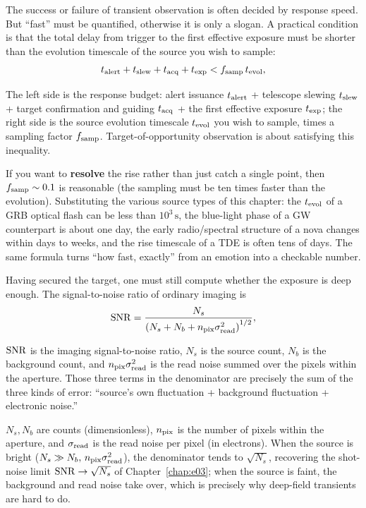 The success or failure of transient observation is often decided by response speed. But ``fast'' must be quantified, otherwise it is only a slogan. A practical condition is that the total delay from trigger to the first effective exposure must be shorter than the evolution timescale of the source you wish to sample:
\begin{equation}
  t_{\rm alert}+t_{\rm slew}+t_{\rm acq}+t_{\rm exp}
  < f_{\rm samp}\,t_{\rm evol},
  \label{eq:e20-response-budget}
\end{equation}
\begin{formulaexplain}
The left side is the response budget: alert issuance \(t_{\rm alert}\) + telescope slewing \(t_{\rm slew}\) + target confirmation and guiding \(t_{\rm acq}\) + the first effective exposure \(t_{\rm exp}\); the right side is the source evolution timescale \(t_{\rm evol}\) you wish to sample, times a sampling factor \(f_{\rm samp}\). Target-of-opportunity observation is about satisfying this inequality.
\end{formulaexplain}
If you want to \textbf{resolve} the rise rather than just catch a single point, then \(f_{\rm samp}\sim0.1\) is reasonable (the sampling must be ten times faster than the evolution). Substituting the various source types of this chapter: the \(t_{\rm evol}\) of a GRB optical flash can be less than \(10^3\,\mathrm{s}\), the blue-light phase of a GW counterpart is about one day, the early radio/spectral structure of a nova changes within days to weeks, and the rise timescale of a TDE is often tens of days. The same formula turns ``how fast, exactly'' from an emotion into a checkable number.

Having secured the target, one must still compute whether the exposure is deep enough. The signal-to-noise ratio of ordinary imaging is
\begin{equation}
  {\rm SNR}=
  \frac{N_s}
  {\left(N_s+N_b+n_{\rm pix}\sigma_{\rm read}^2\right)^{1/2}},
  \label{eq:e20-imaging-snr}
\end{equation}
\begin{formulaexplain}
\({\rm SNR}\) is the imaging signal-to-noise ratio, \(N_s\) is the source count, \(N_b\) is the background count, and \(n_{\rm pix}\sigma_{\rm read}^2\) is the read noise summed over the pixels within the aperture. Those three terms in the denominator are precisely the sum of the three kinds of error: ``source's own fluctuation + background fluctuation + electronic noise.''
\end{formulaexplain}
\(N_s,N_b\) are counts (dimensionless), \(n_{\rm pix}\) is the number of pixels within the aperture, and \(\sigma_{\rm read}\) is the read noise per pixel (in electrons). When the source is bright (\(N_s\gg N_b,\,n_{\rm pix}\sigma_{\rm read}^2\)), the denominator tends to \(\sqrt{N_s}\), recovering the shot-noise limit \({\rm SNR}\to\sqrt{N_s}\) of Chapter~\ref{chap:e03}; when the source is faint, the background and read noise take over, which is precisely why deep-field transients are hard to do.

